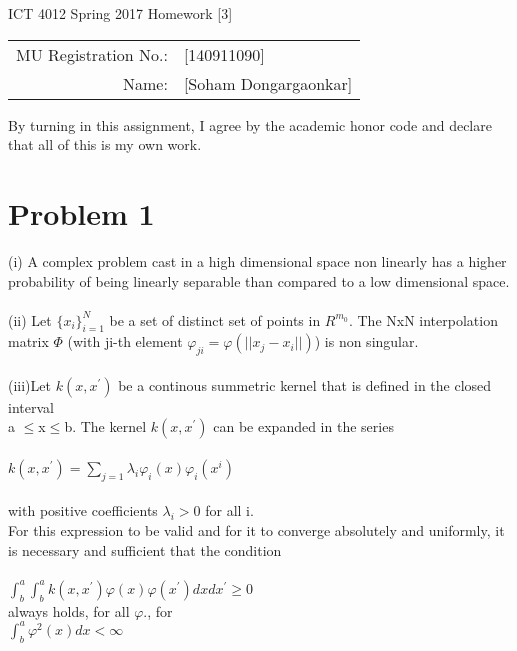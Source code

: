 \documentclass[12pt]{article}
\begin{document}
\begin{center}
{\Large ICT 4012 Spring 2017 Homework [3]} %

\begin{tabular}{rl}
MU Registration No.: & [140911090] \\  %
Name: & [Soham Dongargaonkar] \\   %
\end{tabular}
\end{center}

By turning in this assignment, I agree by the academic honor code and declare that all of this is my own work.

\section*{Problem 1}

\begin{center}
    {(i) A complex problem cast in a high dimensional space non linearly has a higher probability of being linearly separable than compared to a low dimensional space.\\ 
    \text{}\\
    (ii) Let ${\{x_i \}}_{i=1}^{N}$ be a set of distinct set of points in $R^{m_{0}}$. The NxN interpolation matrix $\Phi$ (with ji-th element $\varphi_{ji}=\varphi(||x_j-x_i||)$) is non singular.}\\\text{}\\
    (iii)Let $k(x,x^{'})$ be a continous summetric kernel that is defined in the closed interval \\a $\leq$x$ \leq$b. The kernel $k(x,x^{'})$ can be expanded in the series\\\text{}\\
    $k(x,x^{'}) = \sum_{j=1}{\lambda_{i}\varphi_{i}(x)\varphi_{i}(x^{i})}$\\\text{}\\
    with positive coefficients $\lambda_{i}>0$ for all i.\\
    For this expression to be valid and for it to converge absolutely and uniformly, it is necessary and sufficient that the condition \\\text{}\\
    
    $\int_{b}^{a}\int_{b}^{a}k(x,x^{'}) \varphi(x)\varphi(x^{'})dxdx^{'} \geq{0}$ \\
    always holds, for all $\varphi{.}$, for\\
    $\int_{b}^{a}\varphi^{2}(x)dx < \infty$
    
\end{center}
\end{document}
